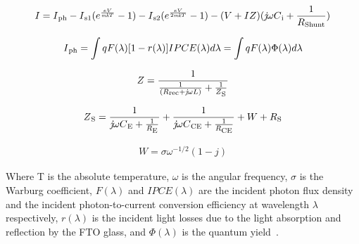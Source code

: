 { \begin{equation}
  \begin{aligned}
    I = I\textsubscript{ph} -  I\textsubscript{s1} (e^{\frac{eV}{\textit{mk}T}}-1) - I\textsubscript{s2} (e^{\frac{eV}{2\textit{mk}T}}-1)- (V+IZ)(\textit{j}{\omega}C\textsubscript{i}+\frac{1}{R\textsubscript{Shunt}}) 
     \label{eq:equ_current_dSC}
  \end{aligned}
 \end{equation}
    
 \begin{equation}
  \begin{aligned}
     I\textsubscript{ph} =\int{qF(\lambda)[1-r(\lambda)]IPCE(\lambda)d\lambda} = \int{qF(\lambda)\Phi(\lambda)d\lambda}  
  \end{aligned}
 \end{equation}
 
  \begin{equation}
   \begin{aligned}
     Z={\dfrac{1}{{\frac{1}{(R\textsubscript{rec}+\textit{j}{\omega}L)}}+{\frac{1}{Z\textsubscript{S}}}}} 
   \end{aligned}
  \end{equation}
  
 \begin{equation}
   \begin{aligned}
    Z\textsubscript{S}={\dfrac{1}{{\textit{j}{\omega}C\textsubscript{E}}+{\frac{1}{R\textsubscript{E}}}}}+{\dfrac{1}{{\textit{j}{\omega}C\textsubscript{CE}}+{\frac{1}{R\textsubscript{CE}}}}}+W+R\textsubscript{S}
   \end{aligned}
  \end{equation}
  
   \begin{equation}
     \begin{aligned}
     W = \sigma{\omega^{-1/2}}(1-\textit{j})
     \end{aligned}
    \end{equation}
    
Where T is the absolute temperature, $\omega$ is the angular frequency, $\sigma$ is the Warburg coefficient, $F(\lambda)$ and  $IPCE(\lambda)$ are the incident photon flux density and the incident photon-to-current conversion efficiency at wavelength $\lambda$ respectively, $r(\lambda)$ is the incident light losses due to the light absorption and reflection by the FTO glass, and $\Phi(\lambda)$ is the quantum yield~\cite{yong2008modeling}.\\
  
}
